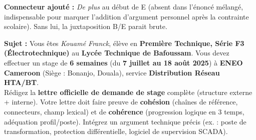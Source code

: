 \documentclass[11pt]{article}
\begin{document}
\begin{corrige}
\textbf{Connecteur ajouté :} \emph{De plus} au début de E (absent dans l'énoncé mélangé, indispensable pour marquer l'addition d'argument personnel après la contrainte scolaire). Sans lui, la juxtaposition B/E parait brute.
\end{corrige}

\begin{exercice}
\textbf{Sujet :} Vous êtes \emph{Kouamé Franck}, élève en \textbf{Première Technique, Série F3 (Électrotechnique)} au \textbf{Lycée Technique de Bafoussam}. Vous devez effectuer un stage de \textbf{6 semaines} (du \textbf{7 juillet au 18 août 2025}) à \textbf{ENEO Cameroon} (Siège : Bonanjo, Douala), service \textbf{Distribution Réseau HTA/BT}.\\
Rédigez la \textbf{lettre officielle de demande de stage} complète (structure externe + interne). Votre lettre doit faire preuve de \textbf{cohésion} (chaînes de référence, connecteurs, champ lexical) et de \textbf{cohérence} (progression logique en 3 temps, adéquation profil/poste). Intégrez un argument technique précis (ex. : poste de transformation, protection différentielle, logiciel de supervision SCADA).
\end{exercice}
\end{document}
